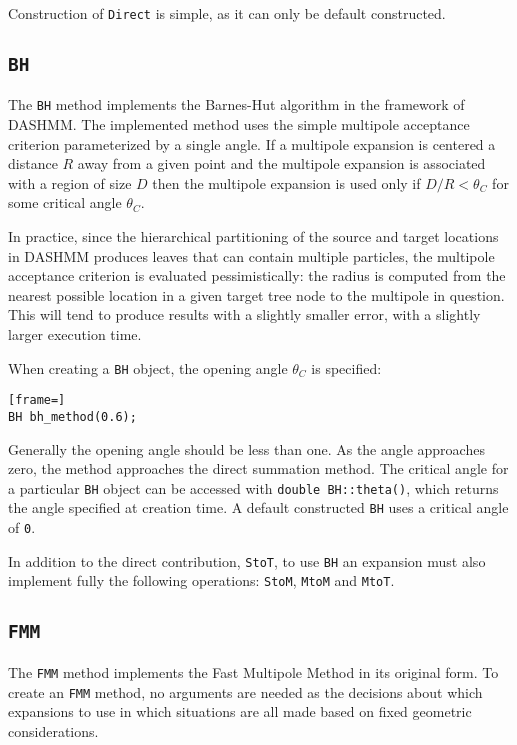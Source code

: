 Construction of \texttt{Direct} is simple, as it can only be default
constructed.

\subsection{\texttt{BH}}

The \texttt{BH} method implements the Barnes-Hut algorithm in the framework of
DASHMM. The implemented method uses the simple multipole acceptance criterion
parameterized by a single angle. If a multipole expansion is centered a
distance $R$ away from a given point and the multipole expansion is
associated with a region of size $D$ then the multipole expansion is used
only if $D/R < \theta_C$ for some critical angle $\theta_C$.

In practice, since the
hierarchical partitioning of the source and target locations in DASHMM produces
leaves that can contain multiple particles, the multipole acceptance criterion
is evaluated pessimistically: the radius is computed from the nearest possible
location in a given target tree node to the multipole in question. This will
tend to produce results with a slightly smaller error, with a slightly larger
execution time.

When creating a \texttt{BH} object, the opening angle $\theta_C$ is specified:

\begin{lstlisting}[frame=]
BH bh_method(0.6);
\end{lstlisting}

\noindent Generally the opening angle should be less than one. As the
angle approaches
zero, the method approaches the direct summation method. The critical angle
for a particular \texttt{BH} object can be accessed with
\texttt{double BH::theta()}, which returns the angle specified at creation
time. A default constructed \texttt{BH} uses a critical angle of \texttt{0}.

In addition to the direct contribution, \texttt{StoT}, to use \texttt{BH} an
expansion must also implement fully the following operations: \texttt{StoM},
\texttt{MtoM} and \texttt{MtoT}.

\subsection{\texttt{FMM}}

The \texttt{FMM} method implements the Fast Multipole Method in its original form.
To create an \texttt{FMM} method, no arguments are needed as the decisions about
which expansions to use in which situations are all made based on fixed
geometric considerations.

